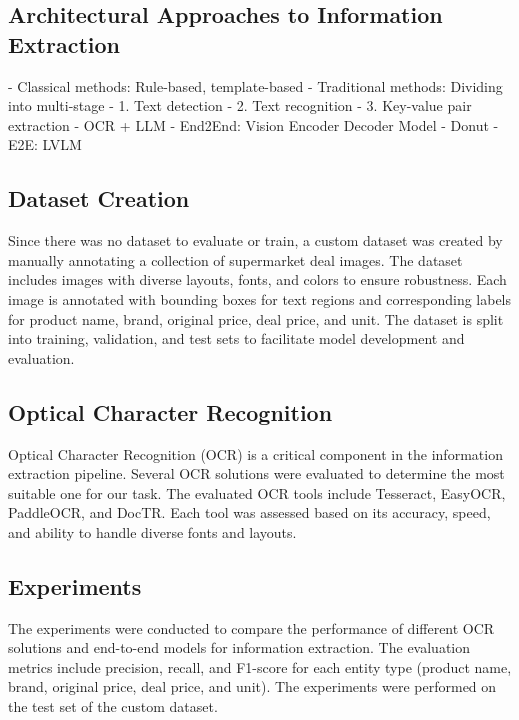 \documentclass[11pt]{article}
\begin{document}
\subsection{Architectural Approaches to Information Extraction}
- Classical methods: Rule-based, template-based
- Traditional methods: Dividing into multi-stage
    - 1. Text detection
    - 2. Text recognition
    - 3. Key-value pair extraction
- OCR + LLM
- End2End: Vision Encoder Decoder Model
    - Donut 
- E2E: LVLM


\subsection{Dataset Creation}
Since there was no dataset to evaluate or train, a custom dataset was created by manually annotating a collection of supermarket deal images. The dataset includes images with diverse layouts, fonts, and colors to ensure robustness. Each image is annotated with bounding boxes for text regions and corresponding labels for product name, brand, original price, deal price, and unit. The dataset is split into training, validation, and test sets to facilitate model development and evaluation. 

\subsection{Optical Character Recognition}
Optical Character Recognition (OCR) is a critical component in the information extraction pipeline. Several OCR solutions were evaluated to determine the most suitable one for our task. The evaluated OCR tools include Tesseract, EasyOCR, PaddleOCR, and DocTR. Each tool was assessed based on its accuracy, speed, and ability to handle diverse fonts and layouts.

\subsection{Experiments}
The experiments were conducted to compare the performance of different OCR solutions and end-to-end models for information extraction. The evaluation metrics include precision, recall, and F1-score for each entity type (product name, brand, original price, deal price, and unit). The experiments were performed on the test set of the custom dataset.
\end{document}
